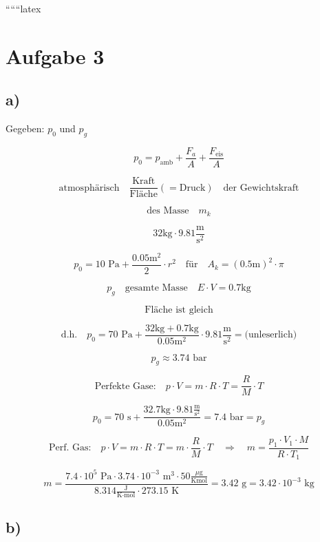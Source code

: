 
``````latex


\section*{Aufgabe 3}

\subsection*{a)}

Gegeben: $p_0$ und $p_g$

\[
p_0 = p_{\text{amb}} + \frac{F_{a}}{A} + \frac{F_{\text{eis}}}{A}
\]

\[
\text{atmosphärisch} \quad \frac{\text{Kraft}}{\text{Fläche}} (= \text{Druck}) \quad \text{der Gewichtskraft}
\]

\[
\text{des Masse} \quad m_k
\]

\[
32 \text{kg} \cdot 9.81 \frac{\text{m}}{\text{s}^2}
\]

\[
p_0 = 10 \text{ Pa} + \frac{0.05 \text{m}^2}{2} \cdot r^2 \quad \text{für} \quad A_k = (0.5 \text{m})^2 \cdot \pi
\]

\[
p_g \quad \text{gesamte Masse} \quad E \cdot V = 0.7 \text{kg}
\]

\[
\text{Fläche ist gleich}
\]

\[
\text{d.h.} \quad p_0 = 70 \text{ Pa} + \frac{32 \text{kg} + 0.7 \text{kg}}{0.05 \text{m}^2} \cdot 9.81 \frac{\text{m}}{\text{s}^2} =  \text{(unleserlich)}
\]

\[
p_g \approx 3.74 \text{ bar}
\]

\[
\text{Perfekte Gase:} \quad p \cdot V = m \cdot R \cdot T = \frac{R}{M} \cdot T
\]

\[
p_0 = 70 \text{ s} + \frac{32.7 \text{kg} \cdot 9.81 \frac{\text{m}}{\text{s}^2}}{0.05 \text{m}^2} = 7.4 \text{ bar} = p_g
\]

\[
\text{Perf. Gas:} \quad p \cdot V = m \cdot R \cdot T = m \cdot \frac{R}{M} \cdot T \quad \Rightarrow \quad m = \frac{p_1 \cdot V_1 \cdot M}{R \cdot T_1}
\]

\[
m = \frac{7.4 \cdot 10^5 \text{ Pa} \cdot 3.74 \cdot 10^{-3} \text{ m}^3 \cdot 50 \frac{\mu \text{g}}{\text{Kmol}}}{8.314 \frac{\text{J}}{\text{K} \cdot \text{mol}} \cdot 273.15 \text{ K}} = 3.42 \text{ g} = 3.42 \cdot 10^{-3} \text{ kg}
\]

\subsection*{b)}

